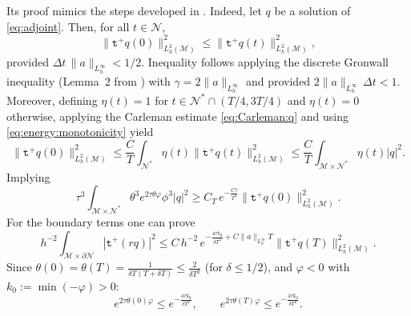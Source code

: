 \documentclass[11pt,oneside,leqno]{amsart}
\numberwithin{equation}{section}
\numberwithin{equation}{section}
\newcommand{\trp}{\mathtt t^+}
\begin{document}
Its proof mimics the steps developed in \cite[section 4]{LMPZ:2023}. Indeed, let $q$ be a solution of \eqref{eq:adjoint}. Then, for all $t\in\mathcal{N}$,
\begin{equation}\label{eq:energy:monotonicity}
\|\trp q(0)\|^{2}_{L^{2}_{h}(\mathcal{M})}\leq\|\trp q(t)\|^{2}_{L^{2}_{h}(\mathcal{M})},
\end{equation}
provided $\Delta t\,\|a\|_{L_{h}^{\infty}}<1/2$. Inequality follows applying the discrete Gronwall inequality (Lemma~2 from \cite{LMPZ:2023}) with $\gamma=2\|a\|_{L_{h}^{\infty}}$ and provided $2\|a\|_{L_{h}^{\infty}}\,\Delta t<1$. Moreover, defining $\eta(t)=1$ for $t\in\mathcal{N}^{\ast}\cap(T/4,3T/4)$ and $\eta(t)=0$ otherwise, applying the Carleman estimate \eqref{eq:Carleman:q} and using \eqref{eq:energy:monotonicity} yield 
\begin{equation}\label{eq:initial:from:energy}
\|\trp q(0)\|^{2}_{L^{2}_{h}(\mathcal{M})}\leq\frac{C}{T}\int_{\mathcal{N}^{\ast}}\eta(t)\|\trp q(t)\|^{2}_{L^{2}_{h}(\mathcal{M})}\leq\frac{C}{T}\int_{\mathcal{M}\times\mathcal{N}^{\ast}}\eta(t)|q|^{2}.
\end{equation}
Implying
\begin{equation}\label{eq:LHS:controls:initial}
\tau^{3}\int_{\mathcal{M}\times\mathcal{N}^{\ast}}\theta^{3}e^{2\tau\theta\varphi}\phi^{3}|q|^{2}\geq C_{T}\,e^{-\frac{C\tau}{T^{2}}}\|\trp q(0)\|^{2}_{L^{2}_{h}(\mathcal{M})}.
\end{equation}
For the boundary terms one can prove
\begin{equation}\label{eq:time:boundary:bound}
h^{-2}\int_{\mathcal{M}\times\partial\mathcal{N}}|\trp(rq)|^{2}\leq C\,h^{-2}\,e^{-\frac{4\tau k_{0}}{\delta T^{2}}+C\|a\|_{L_{h}^{\infty}}T}\|\trp q(T)\|^{2}_{L^{2}_{h}(\mathcal{M})}.
\end{equation}
Since $\theta(0)=\theta(T)=\frac{1}{\delta T(T+\delta T)}\leq\frac{2}{\delta T^{2}}$ (for $\delta\leq 1/2$), and $\varphi<0$ with $k_{0}:=\min(-\varphi)>0$:
\begin{equation*}
e^{2\tau\theta(0)\varphi}\leq e^{-\frac{4\tau k_{0}}{\delta T^{2}}},\qquad e^{2\tau\theta(T)\varphi}\leq e^{-\frac{4\tau k_{0}}{\delta T^{2}}}.
\end{equation*}
\end{document}
